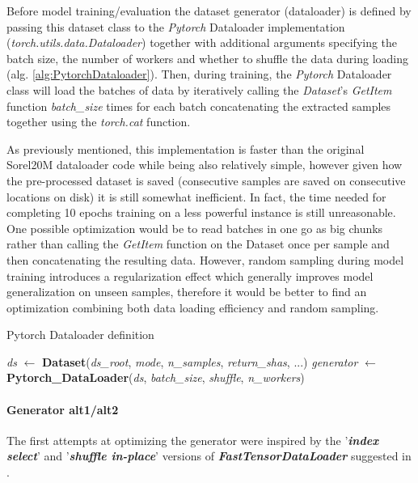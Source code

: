 \documentclass[pdfa%
,cucitura%
]{toptesi}
\begin{document}
Before model training/evaluation the dataset generator (dataloader) is defined by passing this dataset class to the \textit{Pytorch} Dataloader implementation (\textit{torch.utils.data.Dataloader}) together with additional arguments specifying the batch size, the number of workers and whether to shuffle the data during loading (alg. \ref{alg:PytorchDataloader}). Then, during training, the \textit{Pytorch} Dataloader class will load the batches of data by iteratively calling the \textit{Dataset}'s \textit{GetItem} function \textit{batch\_size} times for each batch concatenating the extracted samples together using the \textit{torch.cat} function.

As previously mentioned, this implementation is faster than the original Sorel20M dataloader code while being also relatively simple, however given how the pre-processed dataset is saved (consecutive samples are saved on consecutive locations on disk) it is still somewhat inefficient. In fact, the time needed for completing 10 epochs training on a less powerful instance is still unreasonable. One possible optimization would be to read batches in one go as big chunks rather than calling the \textit{GetItem} function on the Dataset once per sample and then concatenating the resulting data. However, random sampling during model training introduces a regularization effect which generally improves model generalization on unseen samples, therefore it would be better to find an optimization combining both data loading efficiency and random sampling.

\begin{algorithm}[h!]
	\caption{Pytorch Dataloader definition}\label{alg:PytorchDataloader}
	\begin{algorithmic}[1]
		\State \textit{ds} $\gets$ \textbf{Dataset}(\textit{ds\_root}, \textit{mode}, \textit{n\_samples}, \textit{return\_shas}, ...)
		\State \textit{generator} $\gets$ \textbf{Pytorch\_DataLoader}(\textit{ds}, \textit{batch\_size}, \textit{shuffle}, \textit{n\_workers})
	\end{algorithmic}
\end{algorithm}

\paragraph{Generator alt1/alt2}
The first attempts at optimizing the generator were inspired by the '\textit{\textbf{index select}}' and '\textit{\textbf{shuffle in-place}}' versions of \textit{\textbf{FastTensorDataLoader}} suggested in \cite{FastTensorDataloader}.
\end{document}
